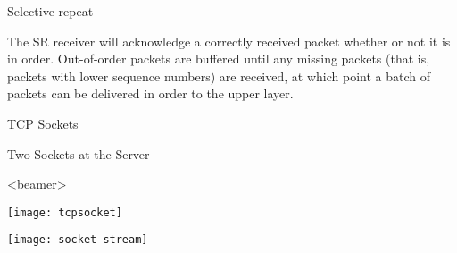 \begin{frame}{Selective-repeat}
  \centering
  \mode<beamer>{ \texttt{[image: tcp-sr]} }%
\end{frame}

The SR receiver will acknowledge a correctly received packet whether or not it is in
order. Out-of-order packets are buffered until any missing packets (that is, packets with
lower sequence numbers) are received, at which point a batch of packets can be delivered
in order to the upper layer. 

\begin{frame}[plain]
  \begin{center}
  \end{center}
\end{frame}

\begin{frame}{TCP Sockets}
  \begin{iblock}{Two Sockets at the Server}
    \centering
  \end{iblock}
\end{frame}

\begin{frame}<beamer>%
  \centering
\end{frame}

\begin{minipage}{.5\linewidth}
  \texttt{[image: tcpsocket]}
\end{minipage}\hfill
\begin{minipage}{.45\linewidth}
  \texttt{[image: socket-stream]}
\end{minipage}

